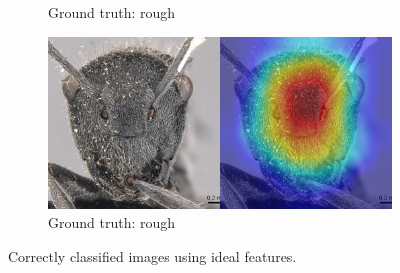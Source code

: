 \documentclass[12pt]{article}
\begin{document}
\begin{figure}
\begin{subfigure}{\subwidth}
        \caption{Ground truth: rough}
        \label{fig:correct_ideal_842}
    \end{subfigure}
    \begin{subfigure}{\subwidth}
        \includegraphics[width=1\linewidth]{assets/gradcam/correct_ideal/1091.png}
        \caption{Ground truth: rough}
        \label{fig:correct_ideal_1091}
    \end{subfigure}
    \caption{Correctly classified images using ideal features.}
    \label{fig:correct_ideal}
\end{figure}
\end{document}

